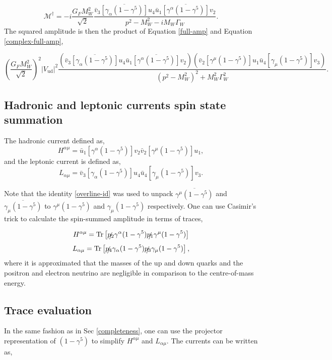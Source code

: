 \documentclass[a4paper,11pt]{article}
\begin{document}
\begin{equation}\label{complex-full-amp}
	\mathcal{M}^\dagger = -i \frac{G_FM_W^2 }{\sqrt{2}}\frac{\bar{v}_3 \overline{\left[\gamma_\alpha (1-\gamma^5)\right]}u_4\bar{u}_1 \overline{\left[\gamma^\alpha (1-\gamma^5)\right]}v_2}{p^2 - M_W^2- iM_W\Gamma_W}.
\end{equation}
The squared amplitude is then the product of Equation \ref{full-amp} and Equation \ref{complex-full-amp},

\begin{equation}\label{squared-full-amp}
	\left(\frac{G_FM_W^2}{\sqrt{2}}\right)^2|V_\text{ud}|^2 \frac{\left( \bar{v}_3 \overline{\left[\gamma_\alpha (1-\gamma^5)\right]}u_4\bar{u}_1 \overline{\left[\gamma^\alpha (1-\gamma^5)\right]}v_2\right) \left( \bar{v}_2\left[\gamma^\mu(1-\gamma^5)\right]u_1\bar{u}_4 \left[\gamma_\mu(1-\gamma^5)\right]v_3\right)}{(p^2-M_W^2)^2 +M_W^2\Gamma_W^2}.
\end{equation}

\subsection{Hadronic and leptonic currents spin state summation}
The hadronic current defined as, $$ H^{\alpha\mu} = \bar{u}_1 \left[\gamma^\alpha (1-\gamma^5)\right]v_2\bar{v}_2\left[\gamma^\mu(1-\gamma^5)\right]u_1,$$
and the leptonic current is defined as, $$L_{\alpha\mu}= \bar{v}_3 \left[\gamma_\alpha (1-\gamma^5)\right]u_4\bar{u}_4 \left[\gamma_\mu(1-\gamma^5)\right]v_3.$$

Note that the identity \ref{overline-id} was used to unpack $\overline{\gamma^\mu(1-\gamma^5)}$ and $\overline{\gamma_\mu(1-\gamma^5)}$ to $\gamma^\mu(1-\gamma^5)$ and $\gamma_\mu(1-\gamma^5)$ respectively. One can use Casimir's trick \cite{Griffiths:2008zz} to calculate the spin-summed amplitude in terms of traces,
 
 
 $$ H^{\alpha\mu} = \text{Tr}\left[\slashed{p_2}\gamma^\alpha(1-\gamma^5) \slashed{p_1} \gamma^\mu(1-\gamma^5)\right]$$
$$ L_{\alpha\mu} = \text{Tr}\left[ \slashed{p_4}\gamma_\alpha(1-\gamma^5) \slashed{p_3} \gamma_\mu(1-\gamma^5)   \right],$$
where it is approximated that the masses of the up and down quarks and the positron and electron neutrino are negligible in comparison to the centre-of-mass energy.

\subsection{Trace evaluation}
In the same fashion as in Sec \ref{completeness}, one can use the projector representation of $(1-\gamma^5)$ to simplify $H^{\alpha\mu}$ and $L_{\alpha \mu}$. The currents can be written as,
\end{document}
